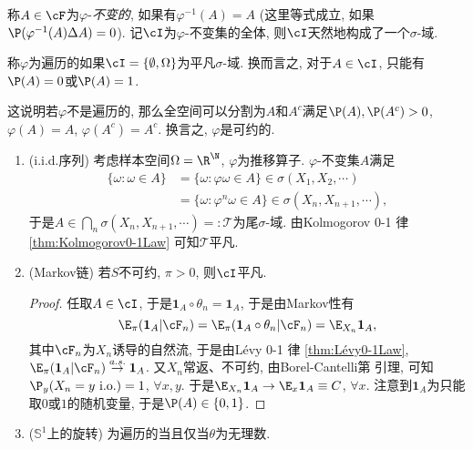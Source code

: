 \documentclass[a4paper, 10pt]{ctexart}
\begin{document}
称$A \in \cF$为$\varphi$-\emph{不变的}, 如果有$\varphi^{-1}(A) = A$ (这里等式成立, 如果$\P(\varphi^{-1}(A) \Delta A) = 0$). 
记$\cI$为$\varphi$-不变集的全体, 则$\cI$天然地构成了一个$\sigma$-域. 

\begin{definition}[遍历性]
	称$\varphi$为遍历的如果$\cI = \{\emptyset, \Omega\}$为平凡$\sigma$-域. 
	换而言之, 对于$A \in \cI$, 只能有$\P(A) = 0$或$\P(A) = 1$. 
\end{definition}
这说明若$\varphi$不是遍历的, 那么全空间可以分割为$A$和$A^c$满足$\P(A), \P(A^c) > 0$, $\varphi(A) = A$, $\varphi(A^c) = A^c$. 
换言之, $\varphi$是可约的. 

\begin{example}
	\begin{enumerate}
		\item (i.i.d.序列) 考虑样本空间$\Omega = \R^{\N}$, $\varphi$为推移算子. $\varphi$-不变集$A$满足\begin{align*}
			\{\omega \colon \omega \in A\} 
			&= \{\omega \colon \varphi \omega \in A\}
			\in \sigma(X_1, X_2, \cdots) \\
			&= \{\omega \colon \varphi^n \omega \in A\} 
			\in \sigma(X_n, X_{n+1}, \cdots), 
		\end{align*}
		于是$A \in \bigcap_n \sigma(X_n, X_{n+1}, \cdots) =: \mathcal T$为尾$\sigma$-域. 
		由Kolmogorov 0-1 律 \ref{thm:Kolmogorov0-1Law} 可知$\mathcal T$平凡. 
		\item (Markov链) 若$S$不可约, $\pi > 0$, 则$\cI$平凡. 
			\begin{proof}
				任取$A \in \cI$, 于是$\mathbf 1_A \circ \theta_n = \mathbf 1_A$, 于是由Markov性有
				\begin{equation*}
					\E_{\pi}(\mathbf 1_A | \cF_n)
					= \E_{\pi}(\mathbf 1_A \circ \theta_n | \cF_n)
					= \E_{X_n} \mathbf 1_A, 
				\end{equation*}
				其中$\cF_n$为$X_n$诱导的自然流, 于是由Lévy 0-1 律 \ref{thm:Lévy0-1Law}, $\E_{\pi}(\mathbf 1_A | \cF_n) \stackrel{a.s.}{\to} \mathbf 1_A$.  
				又$X_n$常返、不可约, 由Borel-Cantelli第 \uppercase\expandafter{} 引理, 可知$\P_y(X_n = y \text{ i.o.} ) =1$, $\forall x,y$. 
				于是$\E_{X_n} \mathbf{1}_A \to \E_x \mathbf{1}_A \equiv C$, $\forall x$. 
				注意到$\mathbf{1}_A$为只能取$0$或$1$的随机变量, 于是$\P(A) \in \{0, 1\}$. 
			\end{proof}
		\item ($\mathbb S^1$上的旋转) 为遍历的当且仅当$\theta$为无理数. 
	\end{enumerate}
\end{example}
\end{document}
